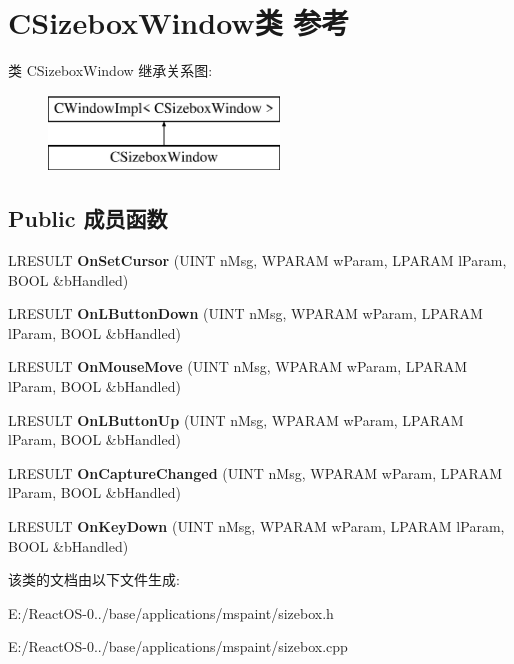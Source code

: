 \hypertarget{class_c_sizebox_window}{}\section{C\+Sizebox\+Window类 参考}
\label{class_c_sizebox_window}
类 C\+Sizebox\+Window 继承关系图\+:\begin{figure}[H]
\begin{center}
\leavevmode
\includegraphics[height=2.000000cm]{class_c_sizebox_window}
\end{center}
\end{figure}
\subsection*{Public 成员函数}
\begin{DoxyCompactItemize}
\item 
\mbox{\label{class_c_sizebox_window_adb9527dec19804a73c08fa5cbed47945}} 
L\+R\+E\+S\+U\+LT {\bfseries On\+Set\+Cursor} (U\+I\+NT n\+Msg, W\+P\+A\+R\+AM w\+Param, L\+P\+A\+R\+AM l\+Param, B\+O\+OL \&b\+Handled)
\item 
\mbox{\label{class_c_sizebox_window_a210655f8a50dc461493fa226e7b2f88e}} 
L\+R\+E\+S\+U\+LT {\bfseries On\+L\+Button\+Down} (U\+I\+NT n\+Msg, W\+P\+A\+R\+AM w\+Param, L\+P\+A\+R\+AM l\+Param, B\+O\+OL \&b\+Handled)
\item 
\mbox{\label{class_c_sizebox_window_afc6bd4a23315f461603d4db1db2d5a86}} 
L\+R\+E\+S\+U\+LT {\bfseries On\+Mouse\+Move} (U\+I\+NT n\+Msg, W\+P\+A\+R\+AM w\+Param, L\+P\+A\+R\+AM l\+Param, B\+O\+OL \&b\+Handled)
\item 
\mbox{\label{class_c_sizebox_window_a08cc5c48a78a2b98e314e992eba39af0}} 
L\+R\+E\+S\+U\+LT {\bfseries On\+L\+Button\+Up} (U\+I\+NT n\+Msg, W\+P\+A\+R\+AM w\+Param, L\+P\+A\+R\+AM l\+Param, B\+O\+OL \&b\+Handled)
\item 
\mbox{\label{class_c_sizebox_window_a5639754a4f3e2e8cedbc2894f6321fb9}} 
L\+R\+E\+S\+U\+LT {\bfseries On\+Capture\+Changed} (U\+I\+NT n\+Msg, W\+P\+A\+R\+AM w\+Param, L\+P\+A\+R\+AM l\+Param, B\+O\+OL \&b\+Handled)
\item 
\mbox{\label{class_c_sizebox_window_a1d46b4400b582ac947d43dca3e355425}} 
L\+R\+E\+S\+U\+LT {\bfseries On\+Key\+Down} (U\+I\+NT n\+Msg, W\+P\+A\+R\+AM w\+Param, L\+P\+A\+R\+AM l\+Param, B\+O\+OL \&b\+Handled)
\end{DoxyCompactItemize}


该类的文档由以下文件生成\+:\begin{DoxyCompactItemize}
\item 
E\+:/\+React\+O\+S-\/0../base/applications/mspaint/sizebox.\+h\item 
E\+:/\+React\+O\+S-\/0../base/applications/mspaint/sizebox.\+cpp\end{DoxyCompactItemize}
